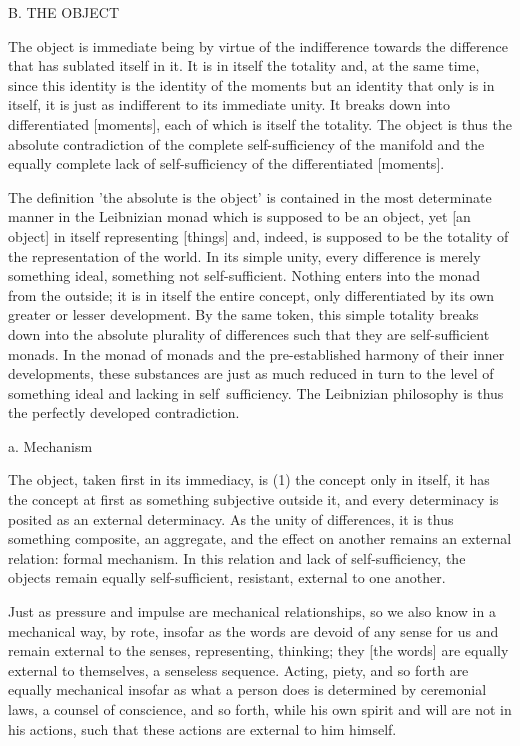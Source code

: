 B. THE OBJECT

The object is immediate being by virtue of
the indifference towards the difference
that has sublated itself in it.
It is in itself the totality
and, at the same time,
since this identity is the identity of the moments
but an identity that only is in itself,
it is just as indifferent to its immediate unity.
It breaks down into differentiated [moments],
each of which is itself the totality.
The object is thus the absolute contradiction of
the complete self-sufficiency of the manifold
and the equally complete lack of self-sufficiency
of the differentiated [moments].

The definition 'the absolute is the object'
is contained in the most determinate manner
in the Leibnizian monad which is supposed to be an object,
yet [an object] in itself representing [things]
and, indeed, is supposed to be the totality of
the representation of the world.
In its simple unity,
every difference is merely something ideal,
something not self-sufficient.
Nothing enters into the monad from the outside;
it is in itself the entire concept,
only differentiated by its own
greater or lesser development.
By the same token, this simple totality breaks down
into the absolute plurality of differences such
that they are self-sufficient monads.
In the monad of monads and the pre-established harmony
of their inner developments,
these substances are just as much reduced in turn
to the level of something ideal
and lacking in self~sufficiency.
The Leibnizian philosophy is thus
the perfectly developed contradiction.

a. Mechanism

The object, taken first in its immediacy, is
(1) the concept only in itself,
it has the concept at first as something subjective outside it, and
every determinacy is posited as an external determinacy.
As the unity of differences, it is thus something composite, an aggregate,
and the effect on another remains an external relation: formal mechanism.
In this relation and lack of self-sufficiency, the objects remain equally
self-sufficient, resistant, external to one another.

Just as pressure and impulse are mechanical relationships,
so we also know in a mechanical way, by rote,
insofar as the words are devoid of any sense for us and
remain external to the senses, representing, thinking;
they [the words] are equally external to themselves, a senseless sequence.
Acting, piety, and so forth are equally mechanical
insofar as what a person does is determined by
ceremonial laws, a counsel of conscience, and so forth,
while his own spirit and will are not in his actions,
such that these actions are external to him himself.

